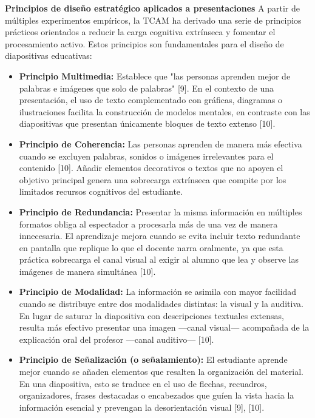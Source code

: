 \documentclass[11pt]{article}
\begin{document}
\textbf{Principios de diseño estratégico aplicados a presentaciones}
A partir de múltiples experimentos empíricos, la TCAM ha derivado una serie de principios prácticos orientados a reducir la carga cognitiva extrínseca y fomentar el procesamiento activo. Estos principios son fundamentales para el diseño de diapositivas educativas:
\begin{itemize}
    \item \textbf{Principio Multimedia:} Establece que "las personas aprenden mejor de palabras e imágenes que solo de palabras" [9]. En el contexto de una presentación, el uso de texto complementado con gráficas, diagramas o ilustraciones facilita la construcción de modelos mentales, en contraste con las diapositivas que presentan únicamente bloques de texto extenso [10].
    \item \textbf{Principio de Coherencia:} Las personas aprenden de manera más efectiva cuando se excluyen palabras, sonidos o imágenes irrelevantes para el contenido [10]. Añadir elementos decorativos o textos que no apoyen el objetivo principal genera una sobrecarga extrínseca que compite por los limitados recursos cognitivos del estudiante.
    \item \textbf{Principio de Redundancia:} Presentar la misma información en múltiples formatos obliga al espectador a procesarla más de una vez de manera innecesaria. El aprendizaje mejora cuando se evita incluir texto redundante en pantalla que replique lo que el docente narra oralmente, ya que esta práctica sobrecarga el canal visual al exigir al alumno que lea y observe las imágenes de manera simultánea [10].
    \item \textbf{Principio de Modalidad:} La información se asimila con mayor facilidad cuando se distribuye entre dos modalidades distintas: la visual y la auditiva. En lugar de saturar la diapositiva con descripciones textuales extensas, resulta más efectivo presentar una imagen —canal visual— acompañada de la explicación oral del profesor —canal auditivo— [10].
    \item \textbf{Principio de Señalización (o señalamiento):} El estudiante aprende mejor cuando se añaden elementos que resalten la organización del material. En una diapositiva, esto se traduce en el uso de flechas, recuadros, organizadores, frases destacadas o encabezados que guíen la vista hacia la información esencial y prevengan la desorientación visual [9], [10].
\end{itemize}
\end{document}
